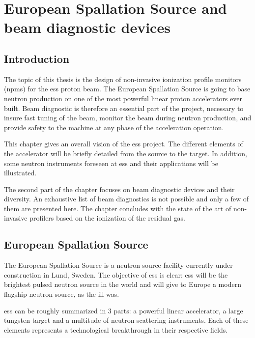 \chapter{European Spallation Source and beam diagnostic devices}
\cleardoublepage

\minitoc
\section{Introduction}
\begin{refsection}
  \label{ch2:Introduction}
  The topic of this thesis is the design of non-invasive ionization profile monitors (\acrshort{npm}s) for the \acrshort{ess} proton beam. The European Spallation Source is going to base neutron production on one of the most powerful linear proton accelerators ever built. Beam diagnostic is therefore an essential part of the project, necessary to insure fast tuning of the beam, monitor the beam during neutron production, and provide safety to the machine at any phase of the acceleration operation.

  This chapter gives an overall vision of the \acrshort{ess} project. The different elements of the accelerator will be briefly detailed from the source to the target. In addition, some neutron instruments foreseen at \acrshort{ess} and their applications will be illustrated.

  The second part of the chapter focuses on beam diagnostic devices and their diversity. An exhaustive list of beam diagnostics is not possible and only a few of them are presented here. The chapter concludes with the state of the art of non-invasive profilers based on the ionization of the residual gas.

  \section{European Spallation Source}
  The European Spallation Source is a neutron source facility currently under construction in Lund, Sweden. The objective of \acrshort{ess} is clear: \acrshort{ess} will be the brightest pulsed neutron source in the world and will give to Europe a modern flagship neutron source, as the \acrshort{ill} was.

  \acrshort{ess} can be roughly summarized in 3 parts: a powerful linear accelerator, a large tungsten target and a multitude of neutron scattering instruments. Each of these elements represents a technological breakthrough in their respective fields.


\end{refsection}
